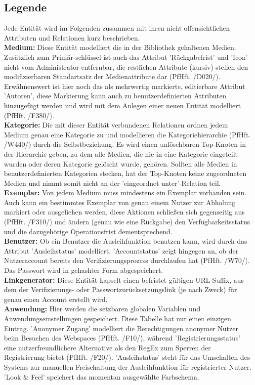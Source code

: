 \documentclass{article}
\begin{document}
\restoregeometry
\newpage

\subsection{Legende}
Jede Entität wird im Folgenden zusammen mit ihren nicht offensichtlichen Attributen und Relationen kurz beschrieben.\\
\textbf{Medium:} Diese Entität modelliert die in der Bibliothek gehaltenen Medien. Zusätzlich zum Primär-schlüssel ist auch das Attribut 'Rückgabefrist' und 'Icon' nicht vom Administrator entfernbar, die restlichen Attribute (kursiv) stellen den modifizierbaren Standartsatz der Medienattribute dar (PfHft. /D020/). Erwähnenswert ist hier noch das als mehrwertig markierte, editierbare Attribut 'Autoren', diese Markierung kann auch zu benutzerdefinierten Attributen hinzugefügt werden und wird mit dem Anlegen einer neuen Entität modelliert (PfHft. /F380/).\\
\textbf{Kategorie:} Die mit dieser Entität verbundenen Relationen ordnen jedem Medium genau eine Kategorie zu und modellieren die Kategoriehierarchie (PfHft. /W440/) durch die Selbstbeziehung. Es wird einen unlöschbaren Top-Knoten in der Hierarchie geben, zu dem alle Medien, die nie in eine Kategorie eingeteilt wurden oder deren Kategorie gelöscht wurde, gehören. Sollten alle Medien in benutzerdefinierten Kategorien stecken, hat der Top-Knoten keine zugeordneten Medien und nimmt somit nicht an der 'eingeordnet unter'-Relation teil.\\
\textbf{Exemplar:} Von jedem Medium muss mindestens ein Exemplar vorhanden sein. Auch kann ein bestimmtes Exemplar von genau einem Nutzer zur Abholung markiert oder ausgeliehen werden, diese Aktionen schließen sich gegenseitig aus (PfHft. /F310/) und ändern (genau wie eine Rückgabe) den Verfügbarkeitsstatus und die dazugehörige Operationsfrist dementsprechend. \\
\textbf{Benutzer:} Ob ein Benutzer die Ausleihfunktion benutzen kann, wird durch das Attribut 'Ausleihstatus' modelliert. 'Accountstatus' zeigt hingegen an, ob der Nutzeraccount bereits den Verifizierungsprozess durchlaufen hat (PfHft. /W70/). Das Passwort wird in gehashter Form abgespeichert. \\
\textbf{Linkgenerator:} Diese Entität kapselt einen befristet gültigen URL-Suffix, aus dem der Verifizierungs- oder Passwortzurücksetzungslink (je nach Zweck) für genau einen Account erstellt wird.\\
\textbf{Anwendung:} Hier werden die setzbaren globalen Variablen und Anwendungseinstellungen gespeichert. Diese Tabelle hat nur einen einzigen Eintrag. 'Anonymer Zugang' modelliert die Berechtigungen anonymer Nutzer beim Besuchen des Webspaces (PfHft. /F10/), während 'Registrierungsstatus' eine nutzerfreundlichere Alternative als den RegEx zum Sperren der Registrierung bietet (PfHft. /F20/). 'Ausleihstatus' steht für das Umschalten des Systems zur manuellen Freischaltung der Ausleihfunktion für registrierter Nutzer. 'Look \& Feel' speichert das momentan ausgewählte Farbschema. \\
\end{document}
